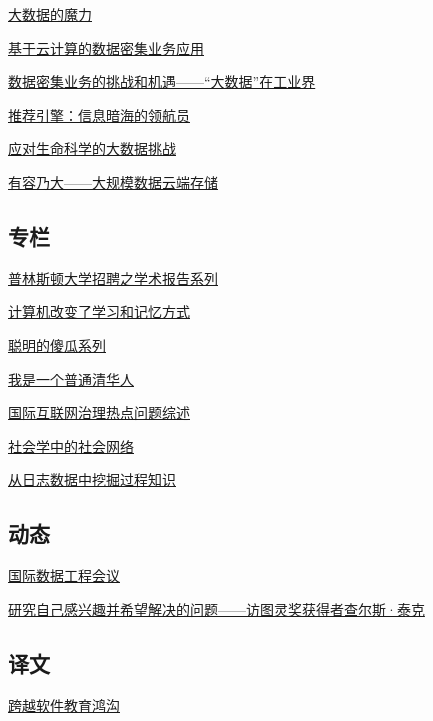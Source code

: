 \documentclass[a4paper]{article}
\begin{document}
\href{http://history.ccf.org.cn/resources/1190201776262/2012/06/18/3.pdf}{大数据的魔力}

\href{http://history.ccf.org.cn/resources/1190201776262/2012/06/18/7.pdf}{基于云计算的数据密集业务应用}

\href{http://history.ccf.org.cn/resources/1190201776262/2012/06/18/1.pdf}{数据密集业务的挑战和机遇——“大数据”在工业界}

\href{http://history.ccf.org.cn/resources/1190201776262/2012/06/18/4.pdf}{推荐引擎：信息暗海的领航员}

\href{http://history.ccf.org.cn/resources/1190201776262/2012/06/18/6.pdf}{应对生命科学的大数据挑战}

\href{http://history.ccf.org.cn/resources/1190201776262/2012/06/18/5.pdf}{有容乃大——大规模数据云端存储}

\subsection{专栏}
\href{http://history.ccf.org.cn/resources/1190201776262/2012/06/18/8.pdf}{普林斯顿大学招聘之学术报告系列}

\href{http://history.ccf.org.cn/resources/1190201776262/2012/06/18/10.pdf}{计算机改变了学习和记忆方式}

\href{http://history.ccf.org.cn/resources/1190201776262/2012/06/18/9.pdf}{聪明的傻瓜系列}

\href{http://history.ccf.org.cn/resources/1190201776262/2012/06/18/11.pdf}{我是一个普通清华人}

\href{http://history.ccf.org.cn/resources/1190201776262/2012/06/18/12.pdf}{国际互联网治理热点问题综述}

\href{http://history.ccf.org.cn/resources/1190201776262/2012/06/18/13.pdf}{社会学中的社会网络}

\href{http://history.ccf.org.cn/resources/1190201776262/2012/06/18/14.pdf}{从日志数据中挖掘过程知识}

\subsection{动态}
\href{http://history.ccf.org.cn/resources/1190201776262/2012/06/18/16.pdf}{国际数据工程会议}

\href{http://history.ccf.org.cn/resources/1190201776262/2012/06/18/15.pdf}{研究自己感兴趣并希望解决的问题——访图灵奖获得者查尔斯·泰克}

\subsection{译文}
\href{http://history.ccf.org.cn/resources/1190201776262/2012/06/18/17.pdf}{跨越软件教育鸿沟}
\end{document}

